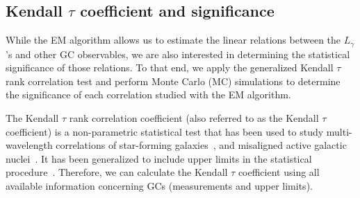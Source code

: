 \documentclass[doublespace,nopageskip]{VTthesis} %
\begin{document}
\subsection{Kendall $\tau$ coefficient and significance}\label{sec:kendall}

While the EM algorithm allows us to estimate the linear relations between the $L_\gamma$'s and other GC observables, we are also interested in determining the statistical significance of those relations. To that end, we apply the generalized Kendall $\tau$ rank correlation test and perform Monte Carlo (MC) simulations to determine the significance of each correlation studied with the EM algorithm. 

The Kendall $\tau$ rank correlation coefficient (also referred to as the Kendall $\tau$ coefficient) is a non-parametric statistical test that has been used to study multi-wavelength correlations of star-forming galaxies~\citep{2012ApJ...755..164A,2020ApJ...894...88A}, and misaligned active galactic nuclei~\citep{2014ApJ...780..161D}. It has been generalized to include upper limits in the statistical procedure~\citep{2012ApJ...755..164A}. Therefore, we can calculate the Kendall $\tau$ coefficient using all available information concerning GCs (measurements and upper limits).
\end{document}
